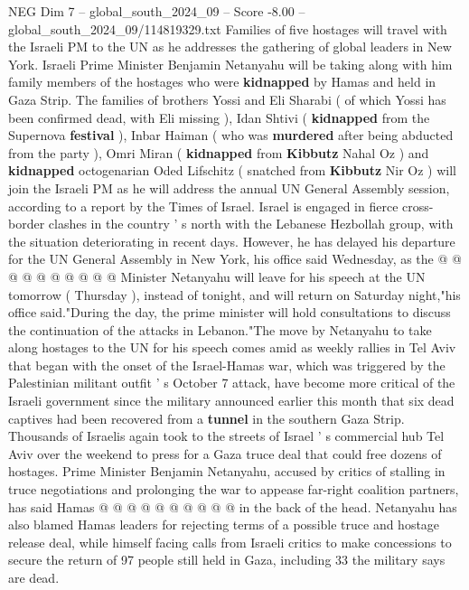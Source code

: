 \begin{textsample}{NEG Dim 7 – global\_south\_2024\_09 – Score -8.00 – global\_south\_2024\_09/114819329.txt}  \label{ex:f7_neg_179}
Families of five hostages will travel with the Israeli PM to the UN as he addresses the gathering of global leaders in New York.
Israeli Prime Minister Benjamin Netanyahu will be taking along with him family members of the hostages who were \textbf{kidnapped} by Hamas and held in Gaza Strip.
The families of brothers Yossi and Eli Sharabi ( of which Yossi has been confirmed dead, with Eli missing ), Idan Shtivi ( \textbf{kidnapped} from the Supernova \textbf{festival} ), Inbar Haiman ( who was \textbf{murdered} after being abducted from the party ), Omri Miran ( \textbf{kidnapped} from \textbf{Kibbutz} Nahal Oz ) and \textbf{kidnapped} octogenarian Oded Lifschitz ( snatched from \textbf{Kibbutz} Nir Oz ) will join the Israeli PM as he will address the annual UN General Assembly session, according to a report by the Times of Israel.
Israel is engaged in fierce cross-border clashes in the country ' s north with the Lebanese Hezbollah group, with the situation deteriorating in recent days.
However, he has delayed his departure for the UN General Assembly in New York, his office said Wednesday, as the @ @ @ @ @ @ @ @ @ @ Minister Netanyahu will leave for his speech at the UN tomorrow ( Thursday ), instead of tonight, and will return on Saturday night,"his office said."During the day, the prime minister will hold consultations to discuss the continuation of the attacks in Lebanon."The move by Netanyahu to take along hostages to the UN for his speech comes amid as weekly rallies in Tel Aviv that began with the onset of the Israel-Hamas war, which was triggered by the Palestinian militant outfit ' s October 7 attack, have become more critical of the Israeli government since the military announced earlier this month that six dead captives had been recovered from a \textbf{tunnel} in the southern Gaza Strip.
Thousands of Israelis again took to the streets of Israel ' s commercial hub Tel Aviv over the weekend to press for a Gaza truce deal that could free dozens of hostages.
Prime Minister Benjamin Netanyahu, accused by critics of stalling in truce negotiations and prolonging the war to appease far-right coalition partners, has said Hamas @ @ @ @ @ @ @ @ @ @ in the back of the head.
Netanyahu has also blamed Hamas leaders for rejecting terms of a possible truce and hostage release deal, while himself facing calls from Israeli critics to make concessions to secure the return of 97 people still held in Gaza, including 33 the military says are dead.

\end{textsample}
